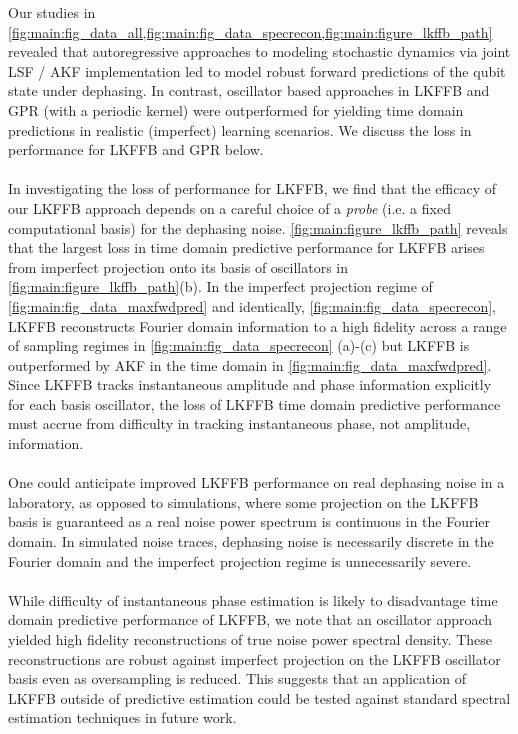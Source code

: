 Our studies in  \cref{fig:main:fig_data_all,fig:main:fig_data_specrecon,fig:main:figure_lkffb_path} revealed that autoregressive approaches to modeling stochastic dynamics via joint LSF / AKF implementation led to model robust forward predictions of the qubit state under dephasing. In contrast, oscillator based approaches in LKFFB and GPR (with a periodic kernel) were outperformed for yielding time domain predictions in realistic (imperfect) learning scenarios. We discuss the loss in performance for LKFFB and GPR below. 
\\
\\
In investigating the loss of performance for LKFFB, we find that the efficacy of our LKFFB approach depends on a careful choice of a \textit{probe} (i.e. a fixed computational basis) for the dephasing noise. \cref{fig:main:figure_lkffb_path} reveals that the largest loss in time domain predictive performance for LKFFB arises from imperfect projection onto its basis of oscillators in \cref{fig:main:figure_lkffb_path}(b). In the imperfect projection regime of \cref{fig:main:fig_data_maxfwdpred} and identically, \cref{fig:main:fig_data_specrecon}, LKFFB reconstructs Fourier domain information to a high fidelity across a range of sampling regimes in \cref{fig:main:fig_data_specrecon} (a)-(c) but LKFFB is outperformed by AKF in the time domain in \cref{fig:main:fig_data_maxfwdpred}. Since LKFFB tracks instantaneous amplitude and phase information explicitly for each basis oscillator, the loss of LKFFB time domain predictive performance must accrue from difficulty in tracking instantaneous phase, not amplitude, information. 
\\
\\
One could anticipate improved LKFFB performance on real dephasing noise in a laboratory, as opposed to simulations, where some projection on the LKFFB basis is guaranteed as a real noise power spectrum is continuous in the Fourier domain.  In simulated noise traces, dephasing noise is necessarily discrete in the Fourier domain and the imperfect projection regime is unnecessarily severe.
\\
\\
While difficulty of instantaneous phase estimation is likely to disadvantage time domain predictive performance of LKFFB, we note that an oscillator approach yielded high fidelity reconstructions of true noise power spectral density. These reconstructions are robust against imperfect projection on the LKFFB oscillator basis even as oversampling is reduced. This suggests that an application of LKFFB outside of predictive estimation could be tested against standard spectral estimation techniques in future work.
